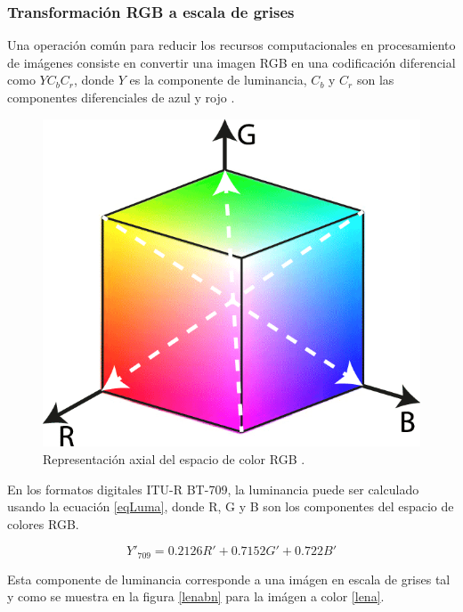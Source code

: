 \documentclass[twoside,spanish,ESP,MSc]{plantillaLabUPV}
\theoremstyle{definition}
\begin{document}
\subsubsection{Transformación RGB a escala de grises}

Una operación común para reducir los recursos computacionales en procesamiento de imágenes consiste en convertir una imagen RGB en una codificación diferencial como $YC_bC_r$, donde $Y$ es la componente de luminancia, $C_b$ y $C_r$ son las componentes diferenciales de azul y rojo \cite{Book_IVSS}.\\

\begin{figure}[h] 
	\centering 
		\includegraphics[scale=.35]{ima/rgbcol} 
	\caption{Representación axial del espacio de color RGB \cite{rgbspace}.} 
	\label{rgbcol} 
\end{figure}

En los formatos digitales ITU-R BT-709, la luminancia puede ser calculado usando la ecuación \ref{eqLuma}, donde R, G y B son los componentes del espacio de colores RGB.

\begin{equation}\label{eqLuma}
{\displaystyle Y'_{\text{709}}=0.2126R'+0.7152G'+0.722B'}
\end{equation}

Esta componente de luminancia corresponde a una imágen en escala de grises tal y como se muestra en la figura \ref{lenabn} para la imágen a color \ref{lena}.
\end{document}

